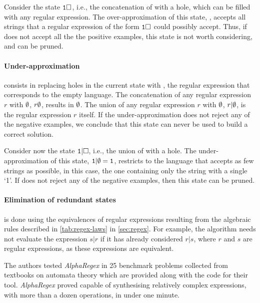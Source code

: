 \begin{example}
Consider the state \(\tt1\Box\), i.e., the concatenation of  with a hole, which can be filled with any regular expression. The over-approximation of this state, , accepts all strings that a regular expression of the form \(\tt1\Box\) could possibly accept. Thus, if  does not accept all the the positive examples, this state is not worth considering, and can be pruned.
\end{example}

\paragraph{Under-approximation} consists in replacing holes in the current state with \regex{\emptyset}, the regular expression that corresponds to the empty language. The concatenation of any regular expression \(r\) with \(\tt\emptyset\), \(r\tt\emptyset\), results in \(\tt\emptyset\). The union of any  regular expression \(r\) with \(\tt\emptyset\), \(r|\tt\emptyset\), is the regular expression \(r\) itself.
If the under-approximation does not reject any of the negative examples,  we conclude that this state can never be used to build a correct solution.

\begin{example}
Consider now the state \(\tt1|\Box\), i.e., the union of  with a hole. The under-approximation of this state, \(\tt1|\emptyset = 1\), restricts  to the language that accepts as few strings as possible, in this case, the one containing only the string with a single `1'. If  does not reject any of the negative examples, then this state can be pruned.
\end{example}

\paragraph{Elimination of redundant states} is done using the equivalences of regular expressions resulting from the algebraic rules described in \autoref{tab:regex-laws} in \autoref{sec:regex}. For example, the algorithm needs not evaluate the expression \(s\texttt{|}r\) if it has already considered \(r\texttt{|}s\), where \(r\) and \(s\) are regular expressions, as these expressions are equivalent.

\medskip

\noindent
The authors tested \textit{AlphaRegex} in 25 benchmark problems collected from textbooks on automata theory which are provided along with the code for their tool.
\textit{AlphaRegex} proved capable of synthesising relatively complex expressions, with more than a dozen operations, in under one minute.

